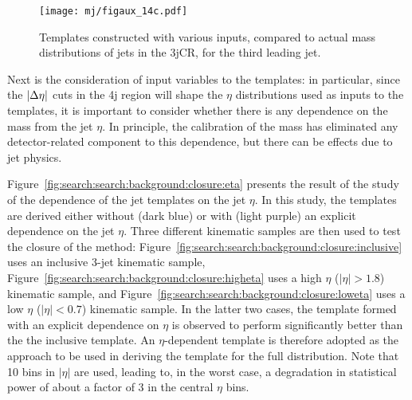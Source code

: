 
\begin{figure}
\centering
\texttt{[image: mj/figaux\_14c.pdf]}
\label{fig:search:search:background:3jCRThird}
\caption{Templates constructed with various inputs, compared to actual mass distributions of jets in the 3jCR, for the third leading jet.}
\end{figure}


Next is the consideration of input variables to the templates: in particular, since the $|\Delta\eta|$ cuts in the 4j region will shape the $\eta$ distributions used as inputs to the templates, it is important to consider whether there is any dependence on the mass from the jet $\eta$. In principle, the calibration of the mass has eliminated any detector-related component to this dependence, but there can be effects due to jet physics.


Figure~\ref{fig:search:search:background:closure:eta} presents the result of the study of the dependence of the jet templates on the jet $\eta$. In this study, the templates are derived either without (dark blue) or with (light purple) an explicit dependence on the jet $\eta$. Three different kinematic samples are then used to test the closure of the method: Figure~\ref{fig:search:search:background:closure:inclusive} uses an inclusive 3-jet kinematic sample, Figure~\ref{fig:search:search:background:closure:higheta} uses a high $\eta$ ($|\eta|>1.8$) kinematic sample, and Figure~\ref{fig:search:search:background:closure:loweta} uses a low $\eta$ ($|\eta|<0.7$) kinematic sample. In the latter two cases, the template formed with an explicit dependence on $\eta$ is observed to perform significantly better than the the inclusive template. An $\eta$-dependent template is therefore adopted as the approach to be used in deriving the template for the full \MJ distribution. Note that 10 bins in $|\eta|$ are used, leading to, in the worst case, a degradation in statistical power of about a factor of 3 in the central $\eta$ bins.

